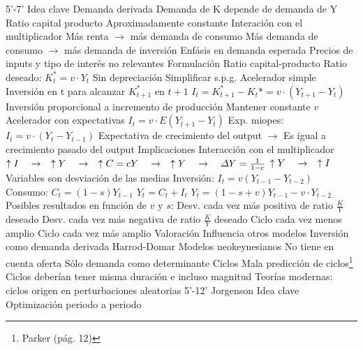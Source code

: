 \documentclass{nuevotema}
\begin{document}
\begin{esquemal}
	\1  5'-7'
		\2 Idea clave
			\3 Demanda derivada
				\4 Demanda de K depende de demanda de Y
			\3 Ratio capital producto
				\4 Aproximadamente constante
			\3 Interación con el multiplicador
				\4 Más renta $\rightarrow$ más demanda de consumo
				\4 Más demanda de consumo $\rightarrow$ más demanda de inversión
			\3 Enfásis en demanda esperada
				\4 Precios de inputs y tipo de interés no relevantes
		\2 Formulación
			\3 Ratio capital-producto
				\4 Ratio deseado: $K_t^* = v \cdot Y_t$
			\3 Sin depreciación
				\4 Simplificar s.p.g.
			\3 Acelerador simple
				\4 Inversión en t para alcanzar $K_{t+1}^*$ en $t+1$
				\4 $I_t = K_{t+1}^* - K_t* = v \cdot (Y_{t+1} - Y_t)$
				\4 Inversión proporcional a incremento de producción
				\4[] Mantener constante $v$
			\3 Acelerador con expectativas
				\4 $I_t = v \cdot E\left( Y_{t+1} - Y_t \right)$
				\4 Exp. miopes: $I_t = v \cdot (Y_t - Y_{t-1})$
				\4[] Expectativa de crecimiento del output
				\4[] $\to$ Es igual a crecimiento pasado del output
		\2 Implicaciones
			\3 Interacción con el multiplicador
				\4 $\uparrow I \quad \rightarrow \quad \uparrow Y \quad \rightarrow \quad \uparrow C = cY \quad \rightarrow \quad \uparrow Y \quad \rightarrow \quad \varDelta Y = \frac{1}{1-c}$
				\4 $\uparrow Y \quad \rightarrow \quad \uparrow I$
				\4 Variables son desviación de las medias
				\4 Inversión: $I_t = v (Y_{t-1} - Y_{t-2})$
				\4 Consumo: $C_t = (1-s)Y_{t-1}$
				\4 $Y_t = C_t + I_t$
				\4 $Y_t = (1-s + v )Y_{t-1} - v \cdot Y_{t-2}$
				\4 Posibles resultados en función de $v$ y $s$:
				\4[I] Desv. cada vez más positiva de ratio $\frac{K}{Y}$ deseado
				\4[II] Desv. cada vez más negativa de ratio $\frac{K}{Y}$ deseado
				\4[III] Ciclo cada vez menos amplio
				\4[IV] Ciclo cada vez más amplio
		\2 Valoración
			\3 Influencia otros modelos
				\4 Inversión como demanda derivada
				\4 Harrod-Domar
				\4 Modelos neokeynesianos
			\3 No tiene en cuenta oferta
				\4 Sólo demanda como determinante
			\3 Ciclos
				\4 Mala predicción de ciclos\footnote{Parker (pág. 12) }
				\4 Ciclos deberían tener misma duración e incluso magnitud
				\4 Teorías modernas: ciclos origen en perturbaciones aleatorias
	\1  5'-12'
		\2 Jorgenson
			\3 Idea clave
				\4 Optimización periodo a periodo

\end{esquemal}
\end{document}
